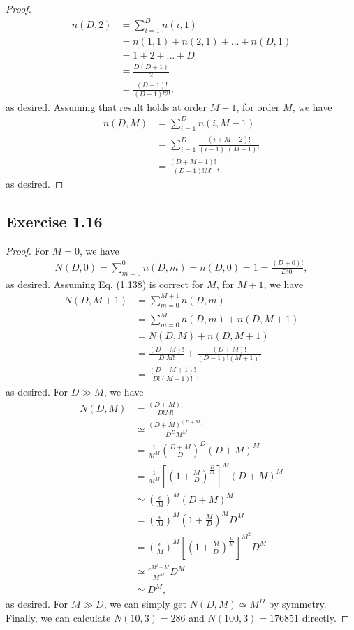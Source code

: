 \documentclass[11pt]{article}
\theoremstyle{definition}
\begin{document}
\begin{proof}
\begin{align*}
n(D,2) &= \sum^D_{i=1}n(i,1) \\
&= n(1,1) + n(2,1) + ... + n(D,1)\\
&= 1 + 2 + ... + D \\
&= \frac{D(D+1)}{2}\\
&= \frac{(D+1)!}{(D-1)!2!},
\end{align*}
as desired. Assuming that result holds at order $M-1$, for order $M$, we have
\begin{align*}
n(D, M) &= \sum^D_{i=1}n(i,M-1) \\
&= \sum^D_{i=1}\frac{(i+M-2)!}{(i-1)!(M-1)!} \\
&= \frac{(D+M-1)!}{(D-1)!M!},
\end{align*}
as desired.
\end{proof}

\subsection{Exercise 1.16}
\begin{proof}
For $M=0$, we have
\begin{align*}
N(D,0) = \sum^{0}_{m=0}n(D,m)
= n(D, 0) = 1
= \frac{(D+0)!}{D!0!},
\end{align*}
as desired. Assuming Eq. (1.138) is correct for $M$, for $M+1$, we have
\begin{align*}
N(D, M+1) &= \sum^{M+1}_{m=0}n(D,m)\\
&= \sum^{M}_{m=0}n(D,m) + n(D, M+1)\\
&= N(D, M) + n(D, M+1)\\
&= \frac{(D+M)!}{D!M!} + \frac{(D+M)!}{(D-1)!(M+1)!}\\
&= \frac{(D+M+1)!}{D!(M+1)!},
\end{align*}
as desired. For $D\gg M$, we have
\begin{align*}
N(D,M) &= \frac{(D+M)!}{D!M!} \\
&\simeq \frac{(D+M)^{(D+M)}}{D^DM^M} \\
&= \frac{1}{M^M}\left(\frac{D+M}{D}\right)^D(D+M)^M \\
&= \frac{1}{M^M}\left[\left(1+\frac{M}{D}\right)^{\frac{D}{M}}\right]^M(D+M)^M \\
&\simeq \left(\frac{e}{M}\right)^M(D+M)^M \\
&= \left(\frac{e}{M}\right)^M\left(1+\frac{M}{D}\right)^MD^M\\
&= \left(\frac{e}{M}\right)^M\left[\left(1+\frac{M}{D}\right)^{\frac{D}{M}}\right]^{M^2}D^M \\
&\simeq \frac{e^{M^2+M}}{M^M}D^M \\
&\simeq D^M,
\end{align*}
as desired. For $M\gg D$, we can simply get $N(D,M) \simeq M^D$ by symmetry. Finally, we can calculate $N(10, 3) = 286$ and $N(100, 3) = 176851$ directly.  
\end{proof}
\end{document}
